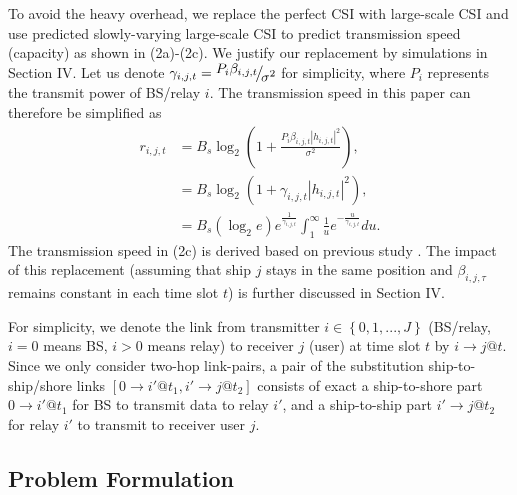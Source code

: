 \documentclass[journal]{IEEEtran}
\begin{document}
   To avoid the heavy overhead, we replace the perfect CSI with large-scale CSI and use predicted slowly-varying large-scale CSI to predict transmission speed (capacity) as shown in (2a)-(2c). We justify our replacement by simulations in Section IV. Let us denote ${\gamma _{i,j,t }} = {\raise0.7ex\hbox{${{P_{i} }{\beta _{i,j,t }}}$} \!\mathord{\left/
    {\vphantom {{{P_{i} }{\beta _{i,j,t }}} {{\sigma ^2}}}}\right.\kern-\nulldelimiterspace}
   \!\lower0.7ex\hbox{${{\sigma ^2}}$}}$ for simplicity, where ${P_{i}}$ represents the transmit power of BS/relay $i$. The transmission speed in this paper can therefore be simplified as
   \begin{subequations}
   \begin{align}
   {r_{i,j,t}} & = {{B_s}{{\log }_2}\left( {1 + \frac{{{P_{i} }{\beta _{i,j,t }}{{\left| {{h_{i,j,t }}} \right|}^2}}}{{{\sigma ^2}}}} \right)},\\
   & = {B_s}{\log }_2 \left( {1 + {\gamma _{i,j,t }}{{\left| {{h_{i,j,t }}} \right|}^2}} \right),\\
   & = {B_s}\left( {{{\log }_2}e} \right){e^{\frac{1}{{{\gamma _{i,j,t }}}}}}\int_1^\infty {\frac{1}{u}{e^{ - \frac{u}{{{\gamma _{i,j,t }}}}}}du} .
   \end{align}
   \end{subequations}
   The transmission speed in (2c) is derived based on previous study \cite{p41}. The impact of this replacement (assuming that ship $j$ stays in the same position and $\beta _{i,j,\tau }$ remains constant in each time slot $t$) is further discussed in Section IV. 
  
   For simplicity, we denote the link from transmitter $i \in \left\{ {0,1,...,J} \right\}$ (BS/relay, $i = 0$ means BS, $i > 0$ means relay) to receiver $j$ (user) at time slot $t$ by $i \to j@t$. Since we only consider two-hop link-pairs, a pair of the substitution ship-to-ship/shore links $\left[ {0 \to i'@{t_1},i' \to j@{t_2}} \right]$ consists of exact a ship-to-shore part $0 \to i'@{t_1}$ for BS to transmit data to relay ${i'}$, and a ship-to-ship part $i' \to j@{t_2}$ for relay ${i'}$ to transmit to receiver user $j$. 
   
   
   \subsection{Problem Formulation}
   
\end{document}

